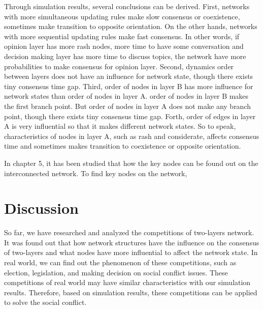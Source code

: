 Through simulation results, several conclusions can be derived. First, networks with more simultaneous updating rules make slow consensus or coexistence, sometimes make transition to opposite orientation. On the other hands, networks with more sequential updating rules make fast consensus. In other words, if opinion layer has more rash nodes, more time to have some conversation and decision making layer has more time to  discuss topics, the network have more probabilities to make consensus for opinion layer. Second, dynamics order between layers does not have an influence for network state, though there exists tiny consensus time gap. Third, order of nodes in layer B has more influence for network states than order of nodes in layer A. order of nodes in layer B makes the first branch point. But order of nodes in layer A does not make any branch point, though there exists tiny consensus time gap. Forth, order of edges in layer A is very influential so that it makes different network states. So to speak, characteristics of nodes in layer A, such as rash and considerate, affects consensus time and sometimes makes transition to coexistence or opposite orientation. 



In chapter 5, it has been studied that how the key nodes can be found out on the interconnected network. To find key nodes on the network, 

\section{Discussion} 

So far, we have researched and analyzed the competitions of two-layers network. It was found out that how network structures have the influence on the consensus of two-layers and what nodes have more influential to affect the network state. In real world, we can find out the phenomenon of these competitions, such as election, legislation, and making decision on social conflict issues. These competitions of real world may have similar characteristics with our simulation results. Therefore, based on simulation results, these competitions can be applied to solve the social conflict.  